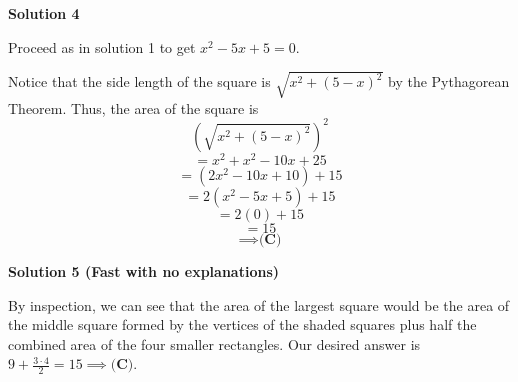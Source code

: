 \begin{enumerate}
\textbf{Solution 4}

Proceed as in solution 1 to get $x^2 - 5x + 5 = 0$.

 Notice that the side length of the square is $\sqrt{x^2+(5-x)^2}$ by the Pythagorean Theorem. Thus, the area of the square is
 \[\left(\sqrt{x^2+(5-x)^2}\right)^2\]
 \[= x^2 + x^2 - 10x + 25\]
 \[= (2x^2 - 10x + 10) + 15\]
 \[= 2(x^2 - 5x + 5) + 15\]
 \[= 2(0) + 15\]
 \[= \boxed{15}\]
 \[\implies \boxed{\textbf{(C)}}\]




\textbf{Solution 5 (Fast with no explanations)}

By inspection, we can see that the area of the largest square would be the area of the middle square formed by the vertices of the shaded squares plus half the combined area of the four smaller rectangles. Our desired answer is $9 + \frac{3\cdot4}{2} = 15\implies \boxed{\textbf{(C)}}$.

 


\end{enumerate}